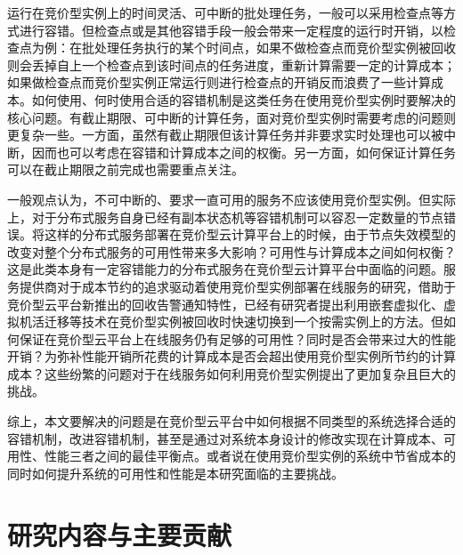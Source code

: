 运行在竞价型实例上的时间灵活、可中断的批处理任务，一般可以采用检查点等方式进行容错。但检查点或是其他容错手段一般会带来一定程度的运行时开销，以检查点为例：在批处理任务执行的某个时间点，如果不做检查点而竞价型实例被回收则会丢掉自上一个检查点到该时间点的任务进度，重新计算需要一定的计算成本；如果做检查点而竞价型实例正常运行则进行检查点的开销反而浪费了一些计算成本。如何使用、何时使用合适的容错机制是这类任务在使用竞价型实例时要解决的核心问题。有截止期限、可中断的计算任务，面对竞价型实例时需要考虑的问题则更复杂一些。一方面，虽然有截止期限但该计算任务并非要求实时处理也可以被中断，因而也可以考虑在容错和计算成本之间的权衡。另一方面，如何保证计算任务可以在截止期限之前完成也需要重点关注。

一般观点认为，不可中断的、要求一直可用的服务不应该使用竞价型实例。但实际上，对于分布式服务自身已经有副本状态机等容错机制可以容忍一定数量的节点错误。将这样的分布式服务部署在竞价型云计算平台上的时候，由于节点失效模型的改变对整个分布式服务的可用性带来多大影响？可用性与计算成本之间如何权衡？这是此类本身有一定容错能力的分布式服务在竞价型云计算平台中面临的问题。服务提供商对于成本节约的追求驱动着使用竞价型实例部署在线服务的研究，借助于竞价型云平台新推出的回收告警通知特性，已经有研究者提出利用嵌套虚拟化、虚拟机活迁移等技术在竞价型实例被回收时快速切换到一个按需实例上的方法。但如何保证在竞价型云平台上在线服务仍有足够的可用性？同时是否会带来过大的性能开销？为弥补性能开销所花费的计算成本是否会超出使用竞价型实例所节约的计算成本？这些纷繁的问题对于在线服务如何利用竞价型实例提出了更加复杂且巨大的挑战。

综上，本文要解决的问题是在竞价型云平台中如何根据不同类型的系统选择合适的容错机制，改进容错机制，甚至是通过对系统本身设计的修改实现在计算成本、可用性、性能三者之间的最佳平衡点。或者说在使用竞价型实例的系统中节省成本的同时如何提升系统的可用性和性能是本研究面临的主要挑战。

\section{研究内容与主要贡献}
